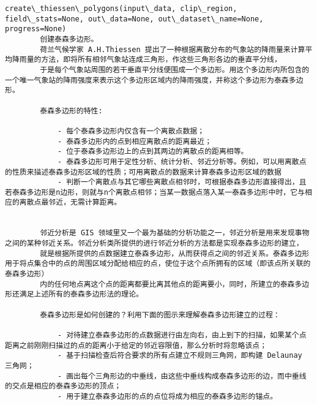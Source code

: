 \documentclass[11pt]{article}
\begin{document}
\begin{Verbatim}[commandchars=\\\{\}]
    create\_thiessen\_polygons(input\_data, clip\_region, field\_stats=None, out\_data=None, out\_dataset\_name=None, progress=None)
        创建泰森多边形。
        荷兰气候学家 A.H.Thiessen 提出了一种根据离散分布的气象站的降雨量来计算平均降雨量的方法，即将所有相邻气象站连成三角形，作这些三角形各边的垂直平分线，
        于是每个气象站周围的若干垂直平分线便围成一个多边形。用这个多边形内所包含的一个唯一气象站的降雨强度来表示这个多边形区域内的降雨强度，并称这个多边形为泰森多边形。
        
        泰森多边形的特性:
        
            - 每个泰森多边形内仅含有一个离散点数据；
            - 泰森多边形内的点到相应离散点的距离最近；
            - 位于泰森多边形边上的点到其两边的离散点的距离相等。
            - 泰森多边形可用于定性分析、统计分析、邻近分析等。例如，可以用离散点的性质来描述泰森多边形区域的性质；可用离散点的数据来计算泰森多边形区域的数据
            - 判断一个离散点与其它哪些离散点相邻时，可根据泰森多边形直接得出，且若泰森多边形是n边形，则就与n个离散点相邻；当某一数据点落入某一泰森多边形中时，它与相应的离散点最邻近，无需计算距离。
        
        
        邻近分析是 GIS 领域里又一个最为基础的分析功能之一，邻近分析是用来发现事物之间的某种邻近关系。邻近分析类所提供的进行邻近分析的方法都是实现泰森多边形的建立，
        就是根据所提供的点数据建立泰森多边形，从而获得点之间的邻近关系。泰森多边形用于将点集合中的点的周围区域分配给相应的点，使位于这个点所拥有的区域（即该点所关联的泰森多边形）
        内的任何地点离这个点的距离都要比离其他点的距离要小，同时，所建立的泰森多边形还满足上述所有的泰森多边形法的理论。
        
        泰森多边形是如何创建的？利用下面的图示来理解泰森多边形建立的过程：
        
            - 对待建立泰森多边形的点数据进行由左向右，由上到下的扫描，如果某个点距离之前刚刚扫描过的点的距离小于给定的邻近容限值，那么分析时将忽略该点；
            - 基于扫描检查后符合要求的所有点建立不规则三角网，即构建 Delaunay 三角网；
            - 画出每个三角形边的中垂线，由这些中垂线构成泰森多边形的边，而中垂线的交点是相应的泰森多边形的顶点；
            - 用于建立泰森多边形的点的点位将成为相应的泰森多边形的锚点。
        

\end{Verbatim}
\end{document}
